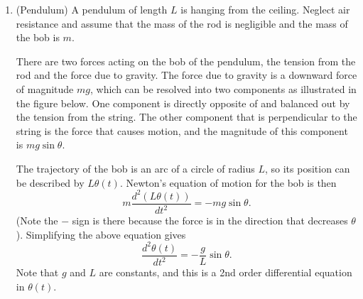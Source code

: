 \documentclass[11pt]{article}
\theoremstyle{definition}
\begin{document}
\begin{enumerate}[leftmargin=*]
 \item (Pendulum) A pendulum of length $L$ is hanging from the ceiling.  Neglect air resistance and assume that the mass of the rod is negligible and the mass of the bob is $m$. 

There are two forces acting on the bob of the pendulum, the tension from the rod and the force due to gravity.   The force due to gravity is a downward force of magnitude $mg$, which can be resolved into two components as illustrated in the figure below.  One component is directly opposite of and balanced out by the tension from the string.  The other component that is perpendicular to the string is the force that causes motion, and the magnitude of this component is $mg\sin \theta$.
\begin{center}
\end{center}

The trajectory of the bob is an arc of a circle of radius $L$, so its position can be described by $L\theta(t)$.  Newton's equation of motion for the bob is then
\[
m \frac{d^2(L\theta(t))}{dt^2}= - mg\sin \theta.
\]
(Note the $-$ sign is there because the force is in the direction that decreases $\theta$).  Simplifying the above equation gives 
\[
\frac{d^2\theta(t)}{dt^2}=-\frac{g}{L}\sin \theta.
\]
Note that $g$ and $L$ are constants, and this is a 2nd order differential equation in $\theta(t)$.


\end{enumerate}
\end{document}
